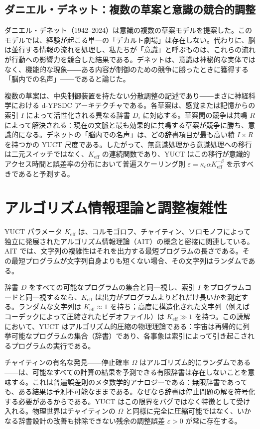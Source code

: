 \documentclass[12pt,a4paper]{article}
\begin{document}
	\subsection{ダニエル・デネット：複数の草案と意識の競合的調整}
	
	ダニエル・デネット（1942–2024）は意識の複数の草案モデルを提案した。このモデルでは、経験が起こる単一の「デカルト劇場」は存在しない。代わりに、脳は並行する情報の流れを処理し、私たちが「意識」と呼ぶものは、これらの流れが行動への影響力を競合した結果である。デネットは、意識は神秘的な実体ではなく、機能的な現象――ある内容が制御のための競争に勝ったときに獲得する「脳内での名声」――であると論じた。
	
	複数の草案は、中央制御装置を持たない分散調整の記述であり――まさに神経科学における d-YPSDC アーキテクチャである。各草案は、感覚または記憶からの索引 \(I\) によって活性化される異なる辞書 \(D_i\) に対応する。草案間の競争は共鳴 \(R\) によって解決される：現在の文脈と最も効果的に共鳴する草案が競争に勝ち、意識的になる。デネットの「脳内での名声」は、どの辞書項目が最も高い積 \(I \times R\) を持つかの YUCT 尺度である。したがって、無意識処理から意識処理への移行は二元スイッチではなく、\(K_{\mathrm{eff}}\) の連続関数であり、YUCT はこの移行が意識的アクセス時間と誤差率の分布において普遍スケーリング則 \(\varepsilon = \kappa_c \alpha K_{\mathrm{eff}}^{-\beta}\) を示すべきであると予測する。
	
	\section{アルゴリズム情報理論と調整複雑性}
	
	YUCT パラメータ \(K_{\mathrm{eff}}\) は、コルモゴロフ、チャイティン、ソロモノフによって独立に発展されたアルゴリズム情報理論（AIT）の概念と密接に関連している。AIT では、文字列の複雑性はそれを出力する最短プログラムの長さである。その最短プログラムが文字列自身よりも短くない場合、その文字列はランダムである。
	
	辞書 \(D\) をすべての可能なプログラムの集合と同一視し、索引 \(I\) をプログラムコードと同一視するなら、\(K_{\mathrm{eff}}\) は出力がプログラムよりどれだけ長いかを測定する。ランダムな文字列は \(K_{\mathrm{eff}} \approx 1\) を持ち；高度に構造化された文字列（例えばコーデックによって圧縮されたビデオファイル）は \(K_{\mathrm{eff}} \gg 1\) を持つ。この読解において、YUCT はアルゴリズム的圧縮の物理理論である：宇宙は再帰的に列挙可能なプログラムの集合（辞書）であり、各事象は索引によって引き起こされるプログラムの実行である。
	
	チャイティンの有名な発見――停止確率 \(\Omega\) はアルゴリズム的にランダムである――は、可能なすべての計算の結果を予測できる有限辞書は存在しないことを意味する。これは普遍誤差則のメタ数学的アナロジーである：無限辞書であっても、ある結果は予測不可能なままである。なぜなら辞書は停止問題の解を符号化する必要があるからである。YUCT はこの限界をバグではなく特徴として受け入れる。物理世界はチャイティンの \(\Omega\) と同様に完全に圧縮可能ではなく、いかなる辞書設計の改善も排除できない残余の調整誤差 \(\varepsilon > 0\) が常に存在する。
	
\end{document}
